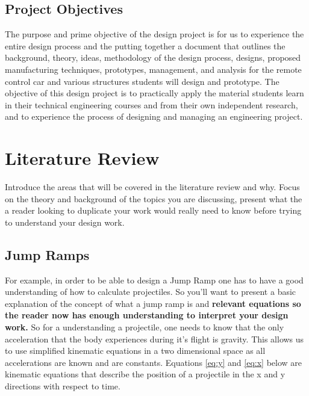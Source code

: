 \documentclass[fleqn,12pt]{project}
\begin{document}
\subsection{Project Objectives}
The purpose and prime objective of the design project is for us to experience the entire design process and the putting together a document that outlines the background, theory, ideas, methodology of the design process,
designs, proposed manufacturing techniques, prototypes, management, and analysis for the remote control car and various structures
students will design and prototype. The objective of this design project is to practically apply the material students learn in their
technical engineering courses and from their own independent research, and to experience the process of designing and managing an engineering project.

\newpage
\section{Literature Review}

Introduce the areas that will be covered in the literature review and why. Focus on the theory and background of the topics you are discussing, present what the a reader looking to duplicate your work would really need to know before trying to understand your design work.

\subsection{Jump Ramps}
For example, in order to be able to design a Jump Ramp one has to have a good understanding of how to calculate projectiles. So you'll want to present a basic explanation of the concept of what a jump ramp is and \textbf{relevant equations so the reader now has enough understanding to interpret your design work.} 
So for a understanding a projectile, one needs to know that the only acceleration that the body experiences during it's flight is gravity. This allows us to use simplified kinematic equations in a two dimensional space as all accelerations are known and are constants. Equations \ref{eq:y} and \ref{eq:x} below are  kinematic equations that describe the position of a projectile in the x and y directions with respect to time.
\end{document}
